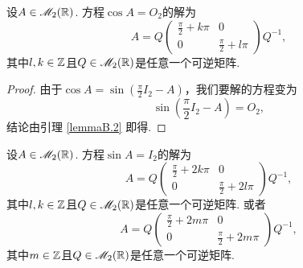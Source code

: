 \begin{mybox}
\begin{lemma}
  设$A\in\mathscr M_2(\mathbb R)$. 方程$\cos A=O_2$的解为
  \[
    A = Q\begin{pmatrix}
      \frac\pi2 + k\pi & 0 \\
      0 & \frac\pi2 + l\pi
    \end{pmatrix}Q^{-1},
  \]
  其中$l,k\in\mathbb Z$且$Q\in\mathscr M_2(\mathbb R)$是任意一个可逆矩阵.
\end{lemma}
\end{mybox}
\begin{proof}
  由于$\cos A=\sin\left(\frac\pi2I_2-A\right)$，我们要解的方程变为
  \[
    \sin\left(\frac\pi2I_2-A\right) = O_2,
  \]
  结论由引理 \ref{lemmaB.2} 即得.
\end{proof}

\begin{mybox}
\begin{lemma}
  设$A\in\mathscr M_2(\mathbb R)$. 方程$\sin A=I_2$的解为
  \[
    A = Q\begin{pmatrix}
      \frac\pi2 + 2k\pi & 0 \\
      0 & \frac\pi2 + 2l\pi
    \end{pmatrix}Q^{-1},
  \]
  其中$l,k\in\mathbb Z$且$Q\in\mathscr M_2(\mathbb R)$是任意一个可逆矩阵. 或者
  \[
    A = Q\begin{pmatrix}
      \frac\pi2 + 2m\pi & 0 \\
      0 & \frac\pi2 + 2m\pi
    \end{pmatrix}Q^{-1},
  \]
  其中$m\in\mathbb Z$且$Q\in\mathscr M_2(\mathbb R)$是任意一个可逆矩阵.
\end{lemma}
\end{mybox}

